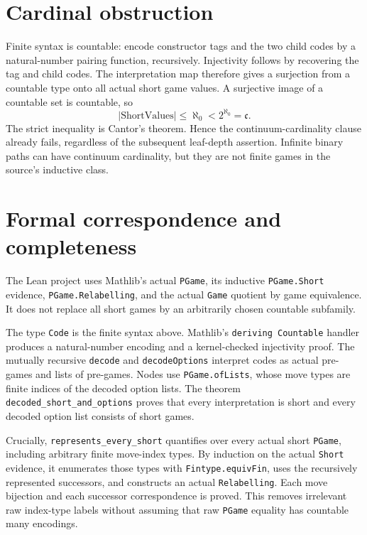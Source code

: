 \documentclass[10pt,a4paper]{article}
\begin{document}
\section*{Cardinal obstruction}
Finite syntax is countable: encode constructor tags and the two child
codes by a natural-number pairing function, recursively. Injectivity
follows by recovering the tag and child codes. The interpretation map
therefore gives a surjection from a countable type onto all actual short
game values. A surjective image of a countable set is countable, so
\[
 |\mathrm{ShortValues}|\leq\aleph_0<2^{\aleph_0}=\mathfrak c.
\]
The strict inequality is Cantor's theorem. Hence the continuum-cardinality
clause already fails, regardless of the subsequent leaf-depth assertion.
Infinite binary paths can have continuum cardinality, but they are not
finite games in the source's inductive class.

\newpage
\section*{Formal correspondence and completeness}
\raggedright
The Lean project uses Mathlib's actual \texttt{PGame}, its inductive
\texttt{PGame.Short} evidence, \texttt{PGame.Relabelling}, and the actual
\texttt{Game} quotient by game equivalence. It does not replace all
short games by an arbitrarily chosen countable subfamily.

The type \texttt{Code} is the finite syntax above. Mathlib's
\texttt{deriving Countable} handler produces a natural-number encoding
and a kernel-checked injectivity proof. The mutually recursive
\texttt{decode} and \texttt{decodeOptions} interpret codes as actual
pre-games and lists of pre-games. Nodes use \texttt{PGame.ofLists},
whose move types are finite indices of the decoded option lists.
The theorem \texttt{decoded\_short\_and\_options} proves that every
interpretation is short and every decoded option list consists of
short games.

Crucially, \texttt{represents\_every\_short} quantifies over every
actual short \texttt{PGame}, including arbitrary finite move-index
types. By induction on the actual \texttt{Short} evidence, it enumerates
those types with \texttt{Fintype.equivFin}, uses the recursively
represented successors, and constructs an actual \texttt{Relabelling}.
Each move bijection and each successor correspondence is proved.
This removes irrelevant raw index-type labels without assuming that
raw \texttt{PGame} equality has countable many encodings.
\end{document}
